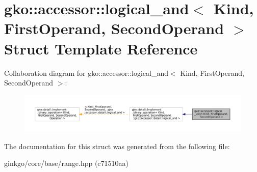 \hypertarget{structgko_1_1accessor_1_1logical__and}{}\section{gko\+:\+:accessor\+:\+:logical\+\_\+and$<$ Kind, First\+Operand, Second\+Operand $>$ Struct Template Reference}
\label{structgko_1_1accessor_1_1logical__and}


Collaboration diagram for gko\+:\+:accessor\+:\+:logical\+\_\+and$<$ Kind, First\+Operand, Second\+Operand $>$\+:
\nopagebreak
\begin{figure}[H]
\begin{center}
\leavevmode
\includegraphics[width=350pt]{structgko_1_1accessor_1_1logical__and__coll__graph}
\end{center}
\end{figure}


The documentation for this struct was generated from the following file\+:\begin{DoxyCompactItemize}
\item 
ginkgo/core/base/range.\+hpp (c71510aa)\end{DoxyCompactItemize}
